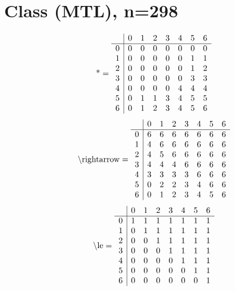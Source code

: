 \documentclass[11pt]{article}
\begin{document}
\section{Class (MTL), n=298}
\[\text{*} = 
\begin{array}{r | r r r r r r r}
 & 0 & 1 & 2 & 3 & 4 & 5 & 6 \\ \hline
0 & 0 & 0 & 0 & 0 & 0 & 0 & 0 \\
1 & 0 & 0 & 0 & 0 & 0 & 1 & 1 \\
2 & 0 & 0 & 0 & 0 & 0 & 1 & 2 \\
3 & 0 & 0 & 0 & 0 & 0 & 3 & 3 \\
4 & 0 & 0 & 0 & 0 & 4 & 4 & 4 \\
5 & 0 & 1 & 1 & 3 & 4 & 5 & 5 \\
6 & 0 & 1 & 2 & 3 & 4 & 5 & 6 \\
\end{array}
\]
\[\text{\textbackslash rightarrow} = 
\begin{array}{r | r r r r r r r}
 & 0 & 1 & 2 & 3 & 4 & 5 & 6 \\ \hline
0 & 6 & 6 & 6 & 6 & 6 & 6 & 6 \\
1 & 4 & 6 & 6 & 6 & 6 & 6 & 6 \\
2 & 4 & 5 & 6 & 6 & 6 & 6 & 6 \\
3 & 4 & 4 & 4 & 6 & 6 & 6 & 6 \\
4 & 3 & 3 & 3 & 3 & 6 & 6 & 6 \\
5 & 0 & 2 & 2 & 3 & 4 & 6 & 6 \\
6 & 0 & 1 & 2 & 3 & 4 & 5 & 6 \\
\end{array}
\]
\[\text{\textbackslash le} = 
\begin{array}{r | r r r r r r r}
 & 0 & 1 & 2 & 3 & 4 & 5 & 6 \\ \hline
0 & 1 & 1 & 1 & 1 & 1 & 1 & 1 \\
1 & 0 & 1 & 1 & 1 & 1 & 1 & 1 \\
2 & 0 & 0 & 1 & 1 & 1 & 1 & 1 \\
3 & 0 & 0 & 0 & 1 & 1 & 1 & 1 \\
4 & 0 & 0 & 0 & 0 & 1 & 1 & 1 \\
5 & 0 & 0 & 0 & 0 & 0 & 1 & 1 \\
6 & 0 & 0 & 0 & 0 & 0 & 0 & 1 \\
\end{array}
\]
\end{document}
